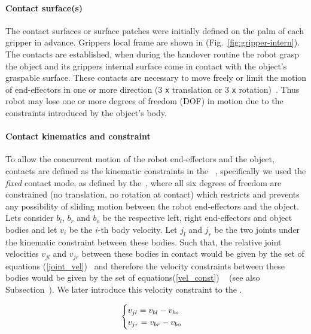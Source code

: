 \paragraph*{Contact surface(s)} 
The contact surfaces or surface patches were initially defined on the palm of each gripper in advance. Grippers local frame are shown in (Fig.~\ref{fig:gripper-intern}). The contacts are established, when during the handover routine the robot grasp the object and its grippers internal surface come in contact with the object's graspable surface. These contacts are necessary to move freely or limit the motion of end-effectors in one or more direction (3 \texttt{x} translation or 3 \texttt{x} rotation)~\cite{bouyarmane2018multi}. Thus robot may lose one or more degrees of freedom (DOF) in motion due to the constraints introduced by the object's body.


\paragraph*{Contact kinematics and constraint}
To allow the concurrent motion of the robot end-effectors and the object, contacts are defined as the kinematic constraints in the ~, specifically we used the \textit{fixed} contact mode, as defined by the~\cite{balkcom2002computing}, where all six degrees of freedom are constrained (no translation, no rotation at contact) which restricts and prevents any possibility of sliding motion between the robot end-effectors and the object. Lets consider $b_{l}$, $b_{r}$ and $b_o$ be the respective left, right end-effectors and object bodies and let $v_i$ be the $i$-th body velocity. Let $j_l$ and $j_r$ be the two joints under the kinematic constraint between these bodies. Such that, the relative joint velocities $v_{jl}$ and $v_{jr}$ between these bodies in contact would be given by the set of equations (\ref{joint_vel})~\cite{Featherstone:1987} and therefore the velocity constraints between these bodies would be given by the set of equations(\ref{vel_const}) ~\cite{ohwovoriole1980externsion} (see also Subsection~). We later introduce this velocity constraint to the .

\begin{equation}\label{joint_vel}
\centering
\begin{cases}
v_{jl} = v_{bl} - v_{bo} \\
v_{jr} = v_{br} - v_{bo} \\
\end{cases}
\end{equation}

